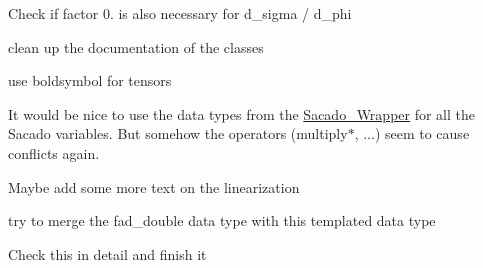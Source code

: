 
\begin{DoxyRefList}
\item[\label{todo__todo000001}%
\hypertarget{todo__todo000001}{}%
page \hyperlink{index}{Trilinos\+:\+:Sacado example documentation} ]Check if factor 0. is also necessary for d\+\_\+sigma / d\+\_\+phi

clean up the documentation of the classes

use boldsymbol for tensors

It would be nice to use the data types from the \hyperlink{namespaceSacado__Wrapper}{Sacado\+\_\+\+Wrapper} for all the Sacado variables. But somehow the operators (multiply$\ast$, ...) seem to cause conflicts again.

Maybe add some more text on the linearization 

try to merge the fad\+\_\+double data type with this templated data type 

Check this in detail and finish it 
\end{DoxyRefList}
